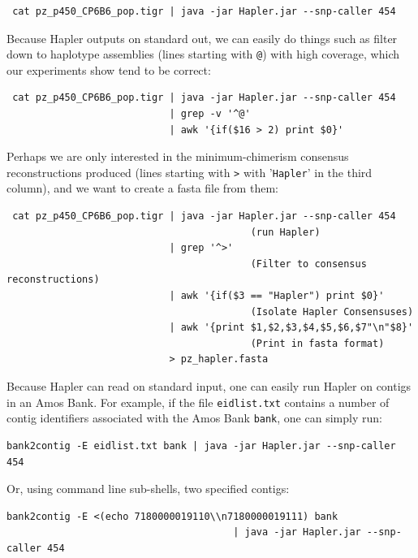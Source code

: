 \documentclass[11pt]{llncs}
\begin{document}
\begin{verbatim}
 cat pz_p450_CP6B6_pop.tigr | java -jar Hapler.jar --snp-caller 454
\end{verbatim}


Because Hapler outputs on standard out, we can easily do things such as filter down to haplotype assemblies (lines starting with \texttt{@}) with high coverage, which our experiments show tend to be
correct:

\begin{verbatim}
 cat pz_p450_CP6B6_pop.tigr | java -jar Hapler.jar --snp-caller 454 
                            | grep -v '^@' 
                            | awk '{if($16 > 2) print $0}'
\end{verbatim}


Perhaps we are only interested in the minimum-chimerism consensus reconstructions produced (lines starting with \texttt{>} with '\texttt{Hapler}' in the third column), and we want to create a fasta file from them:

\begin{verbatim}
 cat pz_p450_CP6B6_pop.tigr | java -jar Hapler.jar --snp-caller 454   
                                          (run Hapler)
                            | grep '^>'
                                          (Filter to consensus reconstructions)
                            | awk '{if($3 == "Hapler") print $0}'     
                                          (Isolate Hapler Consensuses)
                            | awk '{print $1,$2,$3,$4,$5,$6,$7"\n"$8}' 
                                          (Print in fasta format)
                            > pz_hapler.fasta
\end{verbatim}


\newpage
Because Hapler can read on standard input, one can easily run Hapler on contigs in an Amos Bank. 
For example, if the file \texttt{eidlist.txt} contains a number of contig identifiers
associated with the Amos Bank \texttt{bank}, one can simply run:

\begin{verbatim}
bank2contig -E eidlist.txt bank | java -jar Hapler.jar --snp-caller 454
\end{verbatim}

Or, using command line sub-shells, two specified contigs:

\begin{verbatim}
bank2contig -E <(echo 7180000019110\\n7180000019111) bank 
                                       | java -jar Hapler.jar --snp-caller 454
\end{verbatim}
\end{document}
